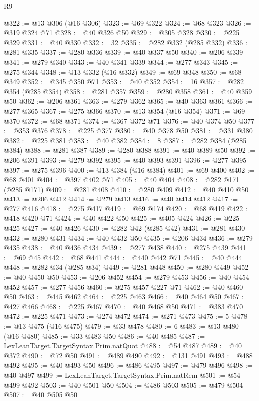 \begin{lexlean}{R9}
\begin{coremodule}
@322 := @13 @306 (@16 @306)
@323 := @69 @322
@324 := @68 @323
@326 := @319 @324 @71
@328 := @40 @326 @50
@329 := @305 @328
@330 := @225 @329
@331 := @40 @330
@332 := 32
@335 := @282 @332 (@285 @332)
@336 := @281 @335
@337 := @280 @336
@339 := @40 @337 @50
@340 := @206 @339
@341 := @279 @340
@343 := @40 @341 @339
@344 := @277 @343
@345 := @275 @344
@348 := @13 @332 (@16 @332)
@349 := @69 @348
@350 := @68 @349
@352 := @345 @350 @71
@353 := @40 @352
@354 := 16
@357 := @282 @354 (@285 @354)
@358 := @281 @357
@359 := @280 @358
@361 := @40 @359 @50
@362 := @206 @361
@363 := @279 @362
@365 := @40 @363 @361
@366 := @277 @365
@367 := @275 @366
@370 := @13 @354 (@16 @354)
@371 := @69 @370
@372 := @68 @371
@374 := @367 @372 @71
@376 := @40 @374 @50
@377 := @353 @376
@378 := @225 @377
@380 := @40 @378 @50
@381 := @331 @380
@382 := @225 @381
@383 := @40 @382
@384 := 8
@387 := @282 @384 (@285 @384)
@388 := @281 @387
@389 := @280 @388
@391 := @40 @389 @50
@392 := @206 @391
@393 := @279 @392
@395 := @40 @393 @391
@396 := @277 @395
@397 := @275 @396
@400 := @13 @384 (@16 @384)
@401 := @69 @400
@402 := @68 @401
@404 := @397 @402 @71
@405 := @40 @404
@408 := @282 @171 (@285 @171)
@409 := @281 @408
@410 := @280 @409
@412 := @40 @410 @50
@413 := @206 @412
@414 := @279 @413
@416 := @40 @414 @412
@417 := @277 @416
@418 := @275 @417
@419 := @69 @174
@420 := @68 @419
@422 := @418 @420 @71
@424 := @40 @422 @50
@425 := @405 @424
@426 := @225 @425
@427 := @40 @426
@430 := @282 @42 (@285 @42)
@431 := @281 @430
@432 := @280 @431
@434 := @40 @432 @50
@435 := @206 @434
@436 := @279 @435
@438 := @40 @436 @434
@439 := @277 @438
@440 := @275 @439
@441 := @69 @45
@442 := @68 @441
@444 := @440 @442 @71
@445 := @40 @444
@448 := @282 @34 (@285 @34)
@449 := @281 @448
@450 := @280 @449
@452 := @40 @450 @50
@453 := @206 @452
@454 := @279 @453
@456 := @40 @454 @452
@457 := @277 @456
@460 := @275 @457 @227 @71
@462 := @40 @460 @50
@463 := @445 @462
@464 := @225 @463
@466 := @40 @464 @50
@467 := @427 @466
@468 := @225 @467
@470 := @40 @468 @50
@471 := @383 @470
@472 := @225 @471
@473 := @274 @472
@474 := @271 @473
@475 := 5
@478 := @13 @475 (@16 @475)
@479 := @33 @478
@480 := 6
@483 := @13 @480 (@16 @480)
@485 := @33 @483 @50
@486 := @40 @485
@487 := LexLeanTarget.TargetSyntax.Prim.natQuot
@488 := @54 @487
@489 := @40 @372
@490 := @72 @50
@491 := @489 @490
@492 := @131 @491
@493 := @488 @492
@495 := @40 @493 @50
@496 := @486 @495
@497 := @479 @496
@498 := @40 @497
@499 := LexLeanTarget.TargetSyntax.Prim.natRem
@501 := @54 @499 @492
@503 := @40 @501 @50
@504 := @486 @503
@505 := @479 @504
@507 := @40 @505 @50

\end{coremodule}
\end{lexlean}
